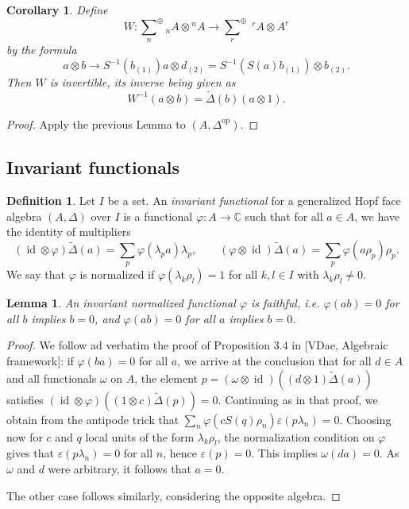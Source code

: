 \documentclass[12pt]{article}
\theoremstyle{change}
\DeclareMathOperator{\id}{id}
\DeclareMathOperator{\op}{\mathrm{op}}
\newcommand{\C}{\mathbb{C}}
\newcommand{\Gr}[5]{\;{}^{\;#2}_{#4}#1_{#5}^{#3}}%
\newcommand{\osum}[1]{\underset{#1}{\sum}^{\oplus}}
\newcommand{\wDelta}{\widetilde{\Delta}}
\newtheorem{Lem}[Theorem]{Lemma}
\newtheorem{Cor}[Theorem]{Corollary}
\theoremstyle{definition}
\newtheorem{Def}[Theorem]{Definition}
\numberwithin{equation}{section}
\begin{document}
\begin{Cor} Define \[W: \osum{n} {}_n A \otimes {}^nA  \rightarrow \osum{r} \; {}^rA\otimes A^r\] by the formula \[a\otimes b \rightarrow S^{-1}(b_{(1)})a\otimes d_{(2)} = S^{-1}(S(a)b_{(1)})\otimes b_{(2)}.\] Then $W$ is invertible, its inverse being given as \[W^{-1}(a\otimes b) = \wDelta(b)(a\otimes 1).\]
\end{Cor}

\begin{proof} Apply the previous Lemma to $(A,\Delta^{\op})$.
\end{proof}

\subsection{Invariant functionals}

\begin{Def} Let $I$ be a set. An \emph{invariant functional} for a generalized Hopf face algebra $(A,\Delta)$ over $I$ is a functional $\varphi:A \rightarrow \C$ such that for all $a\in A$, we have the identity of multipliers \[(\id\otimes \varphi)\wDelta(a) = \sum_p \varphi(\lambda_p a)\lambda_p,\qquad (\varphi\otimes \id)\wDelta(a) = \sum_p\varphi(a\rho_p)\rho_p.\] We say that $\varphi$ is normalized if $\varphi(\lambda_k\rho_l)=1$ for all $k,l\in I$ with $\lambda_k\rho_l\neq 0$.
\end{Def}



\begin{Lem} An invariant normalized functional $\varphi$ is faithful, i.e. $\varphi(ab)=0$ for all $b$ implies $b=0$, and $\varphi(ab)=0$ for all $a$ implies $b=0$.
\end{Lem}

\begin{proof} We follow ad verbatim the proof of Proposition 3.4 in [VDae, Algebraic framework]: if $\varphi(ba)=0$ for all $a$, we arrive at the conclusion that for all $d\in A$ and all functionals $\omega$ on $A$, the element $p = (\omega\otimes \id)((d\otimes 1)\wDelta(a))$ satisfies $(\id\otimes \varphi)((1\otimes c)\wDelta(p)) = 0$. Continuing as in that proof, we obtain from the antipode trick that $\sum_n \varphi(cS(q)\rho_n)\varepsilon(p\lambda_n)=0$. Choosing now for $c$ and $q$ local units of the form $\lambda_k\rho_l$, the normalization condition on $\varphi$ gives that $\varepsilon(p\lambda_n)=0$ for all $n$, hence $\varepsilon(p)=0$. This implies $\omega(da)=0$. As $\omega$ and $d$ were arbitrary, it follows that $a=0$.

The other case follows similarly, considering the opposite algebra.
\end{proof}
\end{document}
